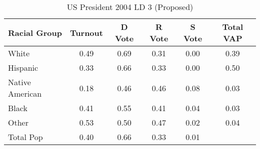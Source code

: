 \begin{table}[htb]
\begin{center}
\caption{US President 2004 LD 3 (Proposed)}
\label{pres04_vap_ld_3}
\begin{tabular}{lccccc}
  \hline
Racial Group & Turnout & D Vote & R Vote & S Vote & Total VAP \\ 
  \hline
White & 0.49 & 0.69 & 0.31 & 0.00 & 0.39 \\ 
  Hispanic & 0.33 & 0.66 & 0.33 & 0.00 & 0.50 \\ 
  Native American & 0.18 & 0.46 & 0.46 & 0.08 & 0.03 \\ 
  Black & 0.41 & 0.55 & 0.41 & 0.04 & 0.03 \\ 
  Other & 0.53 & 0.50 & 0.47 & 0.02 & 0.04 \\ 
  Total Pop & 0.40 & 0.66 & 0.33 & 0.01 &  \\ 
   \hline
\end{tabular}
\end{center}
\end{table}
